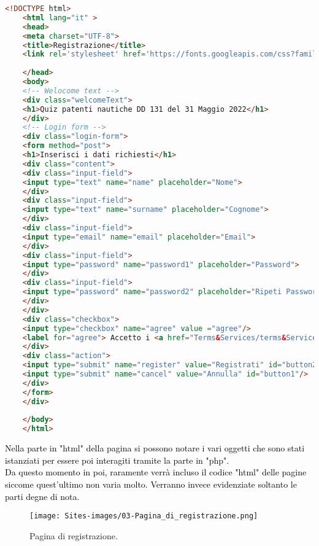  \begin{lstlisting}[language=html]
 	<!DOCTYPE html>
 	<html lang="it" >
 	<head>
 	<meta charset="UTF-8">
 	<title>Registrazione</title>
 	<link rel='stylesheet' href='https://fonts.googleapis.com/css?family=Rubik:400,700'><link rel="stylesheet" href="style.css">
 	
 	</head>
 	<body>
 	<!-- Welocome text -->
 	<div class="welcomeText">
 	<h1>Quiz patenti nautiche DD 131 del 31 Maggio 2022</h1>
 	</div>
 	<!-- Login form -->
 	<div class="login-form">
 	<form method="post">
 	<h1>Inserisci i dati richiesti</h1>
 	<div class="content">
 	<div class="input-field">
 	<input type="text" name="name" placeholder="Nome">
 	</div>
 	<div class="input-field">
 	<input type="text" name="surname" placeholder="Cognome">
 	</div>
 	<div class="input-field">
 	<input type="email" name="email" placeholder="Email">
 	</div>
 	<div class="input-field">
 	<input type="password" name="password1" placeholder="Password">
 	</div>
 	<div class="input-field">
 	<input type="password" name="password2" placeholder="Ripeti Password">
 	</div>
 	</div>
 	<div class="checkbox">
 	<input type="checkbox" name="agree" value ="agree"/>
 	<label for="agree"> Accetto i <a href="Terms&Services/terms&Services.html">Termini</a> di utilizzo</label>
 	</div>
 	<div class="action">
 	<input type="submit" name="register" value="Registrati" id="button2"/>
 	<input type="submit" name="cancel" value="Annulla" id="button1"/>
 	</div>
 	</form>
 	</div>
 	
 	</body>
 	</html>
  \end{lstlisting}\leavevmode\newline
  	
  \begin{minipage}{\textwidth}
  	\raggedright
  	\textcolor{black}{Nella parte in "html" della pagina si possono notare i vari oggetti che sono stati istanziati per essere poi interagiti tramite la parte in "php".\\
  	Da questo momento in poi, raramente verrà incluso il codice "html" delle pagine siccome quest'ultimo non varia molto. Verranno invece evidenziate soltanto le parti degne di nota.}\\
  \end{minipage}\leavevmode\newline
  
  \begin{minipage}{\textwidth}
  	 \begin{figure}[H]
  		\begin{center}
  			\texttt{[image: Sites-images/03-Pagina\_di\_registrazione.png]}
  			\caption{Pagina di registrazione.}
  		\end{center}
  	\end{figure}
  \end{minipage}


